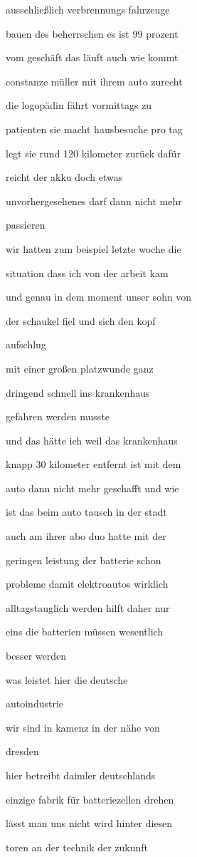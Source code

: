 \documentclass[a4paper, 11pt]{book} %
\begin{document}
ausschließlich verbrennungs fahrzeuge

bauen des beherrschen es ist 99 prozent

vom geschäft das läuft auch wie kommt

constanze müller mit ihrem auto zurecht

die logopädin fährt vormittags zu

patienten sie macht hausbesuche pro tag

legt sie rund 120 kilometer zurück dafür

reicht der akku doch etwas

unvorhergesehenes darf dann nicht mehr

passieren

wir hatten zum beispiel letzte woche die

situation dass ich von der arbeit kam

und genau in dem moment unser sohn von

der schaukel fiel und sich den kopf

aufschlug

mit einer großen platzwunde ganz

dringend schnell ins krankenhaus

gefahren werden musste

und das hätte ich weil das krankenhaus

knapp 30 kilometer entfernt ist mit dem

auto dann nicht mehr geschafft und wie

ist das beim auto tausch in der stadt

auch am ihrer abo duo hatte mit der

geringen leistung der batterie schon

probleme damit elektroautos wirklich

alltagstauglich werden hilft daher nur

eins die batterien müssen wesentlich

besser werden

was leistet hier die deutsche

autoindustrie

wir sind in kamenz in der nähe von

dresden

hier betreibt daimler deutschlands

einzige fabrik für batteriezellen drehen

lässt man uns nicht wird hinter diesen

toren an der technik der zukunft
\end{document}
